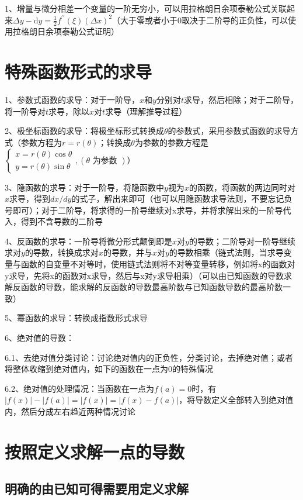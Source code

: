 1、增量与微分相差一个变量的一阶无穷小，可以用拉格朗日余项泰勒公式关联起来$\Delta y-\mathrm{d} y=\frac{1}{2} f^{\prime \prime}(\xi)(\Delta x)^{2}$（大于零或者小于0取决于二阶导的正负性，可以使用拉格朗日余项泰勒公式证明）

\section{特殊函数形式的求导}

1、参数式函数的求导：对于一阶导，$x$和$y$分别对$t$求导，然后相除；对于二阶导，将一阶导对$t$求导，除以$x$对$t$求导（理解推导过程）

2、极坐标函数的求导：将极坐标形式转换成$\theta$的参数式，采用参数式函数的求导方式（参数方程为$r=r(\theta)$；转换成$\theta$为参数的参数方程是$\left\{\begin{array}{l}x=r(\theta) \cos \theta \\y=r(\theta) \sin \theta\end{array},(\theta \text { 为参数 })\right.$）

3、隐函数的求导：对于一阶导，将隐函数中$y$视为$x$的函数，将函数的两边同时对$x$求导，得到$dx/dy$的式子，解出来即可（也可以用隐函数求导法则，不要忘记负号即可）；对于二阶导，将求得的一阶导继续对x求导，并将求解出来的一阶导代入，得到不含导数的二阶导

4、反函数的求导：一阶导将微分形式颠倒即是$x$对$y$的导数；二阶导对一阶导继续求对$y$的导数，转换成求对$x$的导数，并与$x$对$y$的导数相乘（链式法则，当求导变量与函数的自变量不对等时，使用链式法则将不对等变量转移，例如将x的函数对y求导，先将x的函数对x求导，然后与x对y求导相乘）（可以由已知函数的导数求解反函数的导数，能求解的反函数的导数最高阶数与已知函数导数的最高阶数一致）

5、幂函数的求导：转换成指数形式求导

6、绝对值的导数：

6.1、去绝对值分类讨论：讨论绝对值内的正负性，分类讨论，去掉绝对值；或者将整体收缩到绝对值内，如下的函数在一点为0的特殊情况

6.2、绝对值的处理情况：当函数在一点为$f(a)=0$时，有$|f(x)|-|f(a)|=|f(x)|=|f(x)-f(a)|$，将导数定义全部转入到绝对值内，然后分成左右趋近两种情况讨论

\section{按照定义求解一点的导数}



\subsection{明确的由已知可得需要用定义求解}


